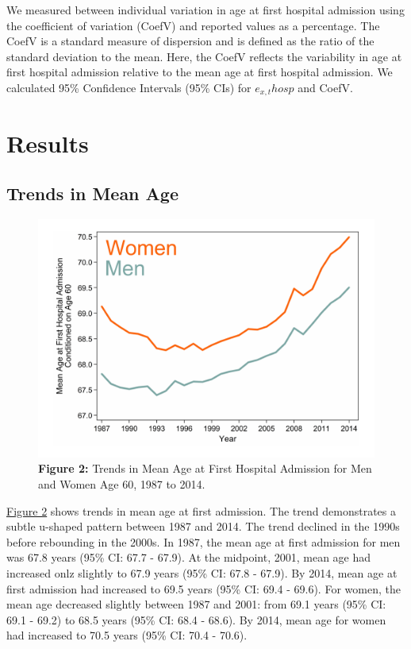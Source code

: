 We measured between individual variation in age at first hospital admission 
using the coefficient of variation (CoefV) and reported values as a percentage. 
The CoefV is a standard measure of dispersion and is defined as the ratio 
of the standard deviation to the mean. Here, the CoefV reflects the variability 
in age at first hospital admission relative to the mean age at first hospital 
admission. We calculated 95\% Confidence Intervals (95\% CIs) for $e_{x,t}hosp$ and 
CoefV.\citep{chiang1984lifetable}\\




\section{Results}

\subsection{Trends in Mean Age}

	\begin{figure}[H]
		\centering
		\includegraphics[scale=0.475]{Paper_3/Figure_2.pdf}
		\caption*{\textbf{Figure 2:} 	Trends in Mean Age at First Hospital 
										Admission for Men and Women Age 60, 1987 to 2014.}
	\label{ch4:fig2}
	\end{figure}

\hyperref[ch4:fig2]{Figure 2} shows trends in mean age at first admission. 
The trend demonstrates a subtle u-shaped pattern between 1987 and 2014. The trend declined in the 
1990s before rebounding in the 2000s. In 1987, the mean age at first admission 
for men was 67.8 years (95\% CI: 67.7 - 67.9). At the midpoint, 2001, mean 
age had increased onlz slightly to 67.9 years (95\% CI: 67.8 - 67.9). By 2014, 
mean age at first admission had increased to 69.5 years (95\% CI: 69.4 - 
69.6). For women, the mean age decreased slightly between 1987 and 2001: 
from 69.1 years (95\% CI: 69.1 - 69.2) to 68.5 years (95\% CI: 68.4 - 
68.6). By 2014, mean age for women had increased to 70.5 years (95\% CI: 
70.4 - 70.6).\\

